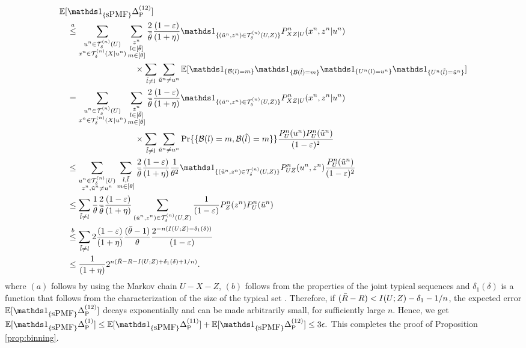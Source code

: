 \begin{align*}
    \EE[&\Ipmf \peonetwo] \\
    &\overset{a}{\leq} \sum_{\substack{\un \in \Tu \\ \xn \in \Txcond}}\sum_{\substack{ \zn \\ l \in [\btheta]\\m\in [\theta]}} 
    \frac{2}{\btheta} \frac{(1-\varepsilon)}{(1+\eta)} 
     \I_{\set{(\utilde^n,\zn) \in \Tuz}} P_{XZ|U}^n(\xn,\zn|\un) \\
    &\hspace{80pt} \times \sum_{\ltilde \neq l} \sum_{\utilde^n \neq \un} \EE[ \I_{\set{\calB(l) = m}}\I_{\set{\calB(\ltilde) = m}} \I_{\set{\Un(l) = \un}} \I_{\set{\Un(\ltilde) = \utilde^n}}] \\
    &\overset{}{=} \sum_{\substack{\un \in \Tu \\ \xn \in \Txcond}}\sum_{\substack{ \zn \\ l \in [\btheta]\\m\in [\theta]}} 
    \frac{2}{\btheta} \frac{(1-\varepsilon)}{(1+\eta)} 
     \I_{\set{(\utilde^n,\zn) \in \Tuz}} P_{XZ|U}^n(\xn,\zn|\un) \\
    &\hspace{80pt} \times \sum_{\ltilde \neq l} \sum_{\utilde^n \neq \un} \text{Pr}\{\set{\calB(l) = m, \calB(\ltilde) = m} \}\frac{P^n_U(\un)P^n_U(\utilde^n)}{(1-\varepsilon)^2} \\
    &\overset{}{\leq} \sum_{\substack{\un \in \Tu \\ \zn, \utilde^n \neq \un}}\sum_{\substack{l, \ltilde \\m\in [\theta]}} 
    \frac{2}{\btheta} \frac{(1-\varepsilon)}{(1+\eta)} \frac{1}{\theta^2}
     \I_{\set{(\utilde^n,\zn) \in \Tuz}} P_{UZ}^n(\un,\zn) \frac{P^n_U(\utilde^n)}{(1-\varepsilon)^2} \\
    &\overset{}{\leq} \sum_{\substack{\ltilde \neq l}} \frac{1}{\theta}
    \frac{2}{\btheta} \frac{(1-\varepsilon)}{(1+\eta)} 
\sum_{\substack{(\utilde^n,\zn)\in \Tuz}} \frac{1}{(1-\varepsilon)} P_{Z}^n(\zn) P^n_U(\utilde^n)\\
    &\overset{b}{\leq} \sum_{\substack{\ltilde \neq l }} 
    2 \frac{(1-\varepsilon)}{(1+\eta)} 
    \frac{(\btheta-1)}{\theta} \frac{2^{-n(I(U;Z) - \delta_1(\delta))}}{(1-\varepsilon)} \\
     &\leq \frac{1}{(1+\eta)}2^{n(\Rbar - R - I(U;Z) + \delta_1(\delta) + 1/n)}. 
\end{align*}
where $(a)$ follows by using the Markov chain $U-X-Z$, $(b)$ follows from the properties of the joint typical sequences and $\delta_1(\delta)$ is a function that follows from the characterization of the size of the typical set \cite{cover2006elements}. Therefore, if $(\bar{R} -R) < I(U;Z) - \delta_1 - 1/n$, the expected error $\EE[\Ipmf \peonetwo]$ decays exponentially and can be made arbitrarily small, for sufficiently large $n$. Hence, we get $\EE[\Ipmf \peone] \leq \EE[\Ipmf \peoneone] + \EE[\Ipmf \peonetwo] \leq 3\epsilon.$ This completes the proof of Proposition \ref{prop:binning}.


